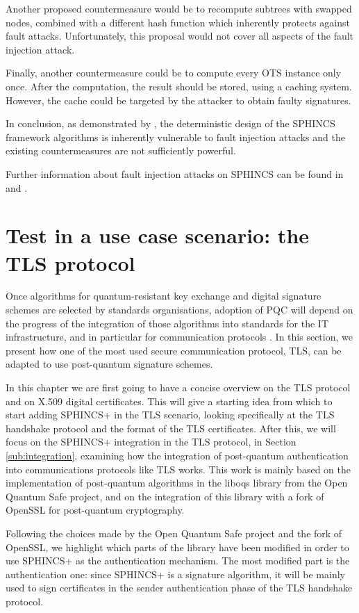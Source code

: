 \documentclass[a4paper,12pt]{article}
\begin{document}
Another proposed countermeasure would be to recompute subtrees with swapped nodes, combined with a different hash function which inherently protects against fault attacks. Unfortunately, this proposal would not cover all aspects of the fault injection attack.

Finally, another countermeasure could be to compute every OTS instance only once. After the computation, the result should be stored, using a caching system. However, the cache could be targeted by the attacker to obtain faulty signatures.

In conclusion, as demonstrated by \cite{12_faultinjection}, the deterministic design of the SPHINCS framework algorithms is inherently vulnerable to fault injection attacks and the existing countermeasures are not sufficiently powerful. 

Further information about fault injection attacks on SPHINCS can be found in \cite{12_faultinjection} and \cite{13_faultattacks}.


\section{Test in a use case scenario: the TLS protocol}
\label{sec:test}

Once algorithms for quantum-resistant key exchange and digital signature schemes are selected by standards organisations, adoption of PQC will depend on the progress of the integration of those algorithms into standards for the IT infrastructure, and in particular for communication protocols \cite{6_NISTPQC_TLS_SSH}.
In this section, we present how one of the most used secure communication protocol, TLS, can be adapted to use post-quantum signature schemes.

In this chapter we are first going to have a concise overview on the TLS protocol and on X.509 digital certificates. This will give a starting idea from which to start adding SPHINCS+ in the TLS scenario, looking specifically at the TLS handshake protocol and the format of the TLS certificates.
After this, we will focus on the SPHINCS+ integration in the TLS protocol, in Section \ref{sub:integration}, examining how the integration of post-quantum authentication into communications protocols like TLS works.
This work is mainly based on the implementation of post-quantum algorithms in the liboqs library from the Open Quantum Safe project, and on the integration of this library with a fork of OpenSSL for post-quantum cryptography. 

Following the choices made by the Open Quantum Safe project and the fork of OpenSSL, we highlight which parts of the library have been modified in order to use SPHINCS+ as the authentication mechanism.
The most modified part is the authentication one: since SPHINCS+ is a signature algorithm, it will be mainly used to sign certificates in the sender authentication phase of the TLS handshake protocol.
\end{document}
